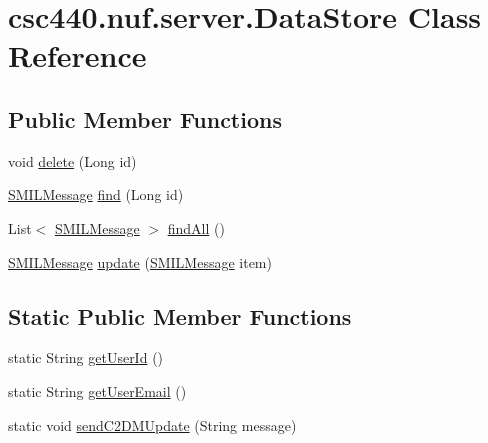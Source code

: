 \hypertarget{classcsc440_1_1nuf_1_1server_1_1_data_store}{\section{csc440.\-nuf.\-server.\-Data\-Store Class Reference}
\label{classcsc440_1_1nuf_1_1server_1_1_data_store}
}
\subsection*{Public Member Functions}
\begin{DoxyCompactItemize}
\item 
void \hyperlink{classcsc440_1_1nuf_1_1server_1_1_data_store_a338414fad64469e2aeb74ffd4833f5d9}{delete} (Long id)
\item 
\hyperlink{classcsc440_1_1nuf_1_1server_1_1_s_m_i_l_message}{S\-M\-I\-L\-Message} \hyperlink{classcsc440_1_1nuf_1_1server_1_1_data_store_ae6c7e81006cca7f550337a8ac3c84a47}{find} (Long id)
\item 
List$<$ \hyperlink{classcsc440_1_1nuf_1_1server_1_1_s_m_i_l_message}{S\-M\-I\-L\-Message} $>$ \hyperlink{classcsc440_1_1nuf_1_1server_1_1_data_store_adeb95b19f2aef0eae3d55b5aabf63660}{find\-All} ()
\item 
\hyperlink{classcsc440_1_1nuf_1_1server_1_1_s_m_i_l_message}{S\-M\-I\-L\-Message} \hyperlink{classcsc440_1_1nuf_1_1server_1_1_data_store_ab66ed1adeb1a5ee0ce37bf5404909e11}{update} (\hyperlink{classcsc440_1_1nuf_1_1server_1_1_s_m_i_l_message}{S\-M\-I\-L\-Message} item)
\end{DoxyCompactItemize}
\subsection*{Static Public Member Functions}
\begin{DoxyCompactItemize}
\item 
static String \hyperlink{classcsc440_1_1nuf_1_1server_1_1_data_store_aec9033c4e9624646beb5276de28bfe59}{get\-User\-Id} ()
\item 
static String \hyperlink{classcsc440_1_1nuf_1_1server_1_1_data_store_a3749afd0edd374001b7a29ef14495ffc}{get\-User\-Email} ()
\item 
static void \hyperlink{classcsc440_1_1nuf_1_1server_1_1_data_store_ad7c4ecf86f1850c8ba359f20feec8797}{send\-C2\-D\-M\-Update} (String message)
\end{DoxyCompactItemize}


